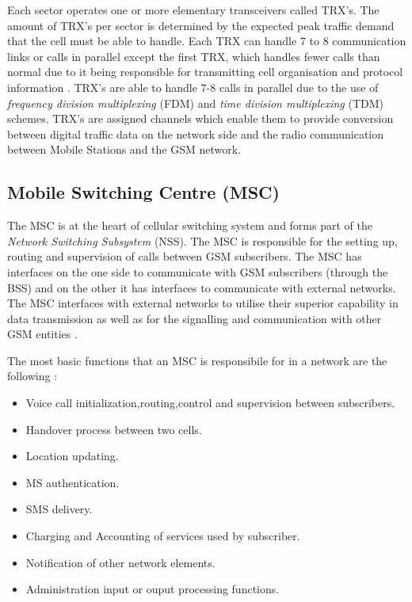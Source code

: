 Each sector operates one or more elementary transceivers called TRX’s. The amount of TRX’s per sector is determined by the expected peak traffic demand that the cell must be able to handle. Each TRX can handle 7 to 8 communication links or calls in parallel except the first TRX, which handles fewer calls than normal due to it being responsible for transmitting cell organisation and protocol information \cite{Eisenblatter}. TRX’s are able to handle 7-8 calls in parallel due to the use of \emph{frequency division multiplexing} (FDM) and \emph{time division multiplexing} (TDM) schemes. TRX’s are assigned channels which enable them to provide conversion between digital traffic data on the network side and the radio communication between Mobile Stations and the GSM network\cite{ACOvsEA,FAPOrientationModel}.

\subsection{Mobile Switching Centre (MSC)}

The MSC is at the heart of cellular switching system and forms part of the \emph{Network Switching Subsystem} (NSS). The MSC is responsible for the setting up, routing and supervision of calls between GSM subscribers. The MSC has interfaces on the one side to communicate with GSM subscribers (through the BSS) and on the other it has interfaces to communicate with external networks. The MSC interfaces with external networks to utilise their superior capability in data transmission as well as for the signalling and communication with other GSM entities \cite{GSM92}. 

The most basic functions that an MSC is responsibile for in a network are the following \cite{wirelesstelcoMullet}:
\begin{itemize}
\item Voice call initialization,routing,control and supervision between subscribers.
\item Handover process between two cells.
\item Location updating.
\item MS authentication.
\item SMS delivery.
\item Charging and Accounting of services used by subscriber.
\item Notification of other network elements.
\item Administration input or ouput processing functions.
\end{itemize}

